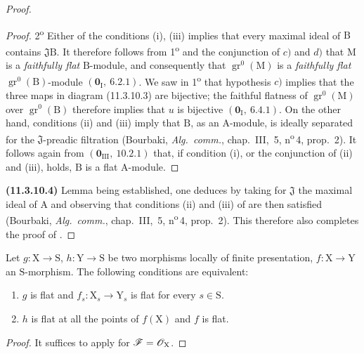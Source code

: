 \begin{proof}
\begin{proof}
2\textsuperscript{o} Either of the conditions (i), (iii) implies that every maximal ideal of $\mathrm{B}$ contains $\mathfrak{J}\mathrm{B}$. It therefore follows from 1\textsuperscript{o} and the conjunction of $c)$ and $d)$ that $\mathrm{M}$ is a \emph{faithfully flat} $\mathrm{B}$-module, and consequently that $\operatorname{gr}^0(\mathrm{M})$ is a \emph{faithfully flat} $\operatorname{gr}^0(\mathrm{B})$-module $(\mathbf{0}_{\mathrm{I}},~6.2.1)$. We saw in 1\textsuperscript{o} that hypothesis $c)$ implies that the three maps in diagram \textup{(11.3.10.3)} are bijective; the faithful flatness of $\operatorname{gr}^0(\mathrm{M})$ over $\operatorname{gr}^0(\mathrm{B})$ therefore implies that $u$ is bijective $(\mathbf{0}_{\mathrm{I}},~6.4.1)$. On the other hand, conditions (ii) and (iii) imply that $\mathrm{B}$, as an $\mathrm{A}$-module, is ideally separated for the $\mathfrak{J}$-preadic filtration (Bourbaki, \emph{Alg.\ comm.}, chap.~III, \textsection\,5, n\textsuperscript{o}\,4, prop.~2). It follows again from $(\mathbf{0}_{\mathrm{III}},~10.2.1)$ that, if condition (i), or the conjunction of (ii) and (iii), holds, $\mathrm{B}$ is a flat $\mathrm{A}$-module.
\end{proof}

\textbf{(11.3.10.4)} Lemma  being established, one deduces  by taking for $\mathfrak{J}$ the maximal ideal of $\mathrm{A}$ and observing that conditions (ii) and (iii) of  are then satisfied (Bourbaki, \emph{Alg.\ comm.}, chap.~III, \textsection\,5, n\textsuperscript{o}\,4, prop.~2). This therefore also completes the proof of .
\end{proof}

\begin{corollary}[11.3.11]
\label{IV.11.3.11}
Let $g:\mathrm{X}\to\mathrm{S}$, $h:\mathrm{Y}\to\mathrm{S}$ be two morphisms locally of finite presentation, $f:\mathrm{X}\to\mathrm{Y}$ an $\mathrm{S}$-morphism. The following conditions are equivalent:
\begin{enumerate}[label=\emph{\alph*)}]
  \item $g$ is flat and $f_s:\mathrm{X}_s\to\mathrm{Y}_s$ is flat for every $s\in\mathrm{S}$.
  \item $h$ is flat at all the points of $f(\mathrm{X})$ and $f$ is flat.
\end{enumerate}
\end{corollary}

\begin{proof}
It suffices to apply  for $\mathscr{F}=\mathscr{O}_\mathrm{X}$.
\end{proof}

